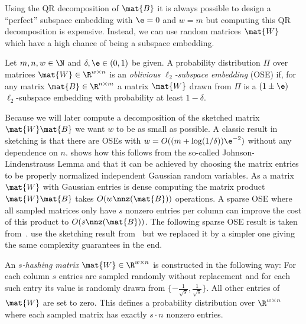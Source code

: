 Using the QR decomposition of \(\mat{B}\) it is always possible to design a \enquote{perfect} subspace embedding with \(\e = 0\) and \(w = m\)
but computing this QR decomposition is expensive.
Instead, we can use random matrices \(\mat{W}\) which have a high chance of being a subspace embedding.

\begin{definition}\label{def:oblivious-subspace-embedding}
Let \(m, n, w \in \N\) and \(\delta, \e \in (0, 1)\) be given.
A probability distribution \(\Pi\) over matrices \(\mat{W} \in \R^{w \times n}\) is an \emph{oblivious \(\ell_2\)-subspace embedding} (OSE) if, for any matrix \(\mat{B} \in \R^{n \times m}\) a matrix \(\mat{W}\) drawn from \(\Pi\) is a \((1\pm\e)\) \(\ell_2\)-subspace embedding with probability at least \(1 - \delta\).
\end{definition}

Because we will later compute a decomposition of the sketched matrix \(\mat{W}\mat{B}\) we want \(w\) to be as small as possible.
A classic result in sketching is that there are OSEs with \(w = O((m + \log(1/\delta))\e^{-2})\) without any dependence on \(n\).
\Textcite[Theorem 6]{Woodruff-Sketching} shows how this follows from the so-called Johnson-Lindenstrauss Lemma and that it can be achieved by choosing the matrix entries to be properly normalized independent Gaussian random variables.
As a matrix \(\mat{W}\) with Gaussian entries is dense computing the matrix product \(\mat{W}\mat{B}\) takes \(O(w \nnz(\mat{B}))\) operations.
A sparse OSE where all sampled matrices only have \(s\) nonzero entries per column can improve the cost of this product to \(O(s \nnz(\mat{B}))\).
The following sparse OSE result is taken from~\cite{Cohen-NearlyTightObliviousSubspaceEmbeddings}.
\Textcite{Avron-FasterRandomizedInfeasibleIPMs} use the sketching result from~\cite{Cohen-OptimalApproximateMatrixProduct} but we replaced it by a simpler one giving the same complexity guarantees in the end.

\begin{definition}\label{def:s-hasing-matrix}
An \emph{\(s\)-hashing matrix} \(\mat{W} \in \R^{w \times n}\) is constructed in the following way:
For each column \(s\) entries are sampled randomly without replacement and for each such entry its value is randomly drawn from \(\{ - \frac{1}{\sqrt{s}}, \frac{1}{\sqrt{s}} \}\).
All other entries of \(\mat{W}\) are set to zero.
This defines a probability distribution over \(\R^{w \times n}\) where each sampled matrix has exactly \(s \cdot n\) nonzero entries.
\end{definition}

